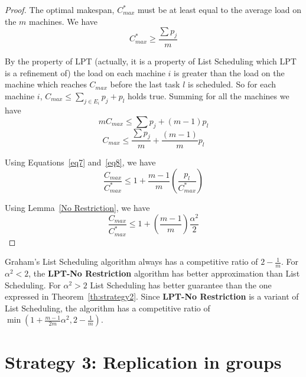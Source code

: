 \documentclass[10pt, conference, compsocconf]{IEEEtran}
\begin{document}
\begin{proof}
  The optimal makespan, $C_{max}^{*}$ must be at least equal to the
  average load on the $m$ machines. We have
  \begin{equation}\label{eq7}
    C_{max}^{*}\geq\frac{\sum p_j}{m}
  \end{equation}

  By the property of LPT (actually, it is a property of List
  Scheduling which LPT is a refinement of) the load on each machine
  $i$ is greater than the load on the machine which reaches $C_{max}$
  before the last task $l$ is scheduled. So for each machine $i$,
  $C_{max} \leq \sum_{j \in E_i}^{}{p_j} + p_l$ holds true.  Summing
  for all the machines we have
  \begin{equation}\nonumber
    mC_{max} \leq  \sum {p_j} + (m-1)p_l
  \end{equation}
  \begin{equation}\label{eq8}
    C_{max} \leq  \frac{\sum {p_j}}{m} + \frac{(m-1)}{m}p_l
  \end{equation}
  
  Using Equations~\ref{eq7} and~\ref{eq8}, we have
  \begin{equation}\nonumber
    \frac{C_{max}}{C_{max}^{*}} \leq 1 + {\frac{m-1}{m}}\left(\frac{p_l}{C_{max}^{*}}\right)
  \end{equation}
  
  Using Lemma~\ref{No Restriction}, we have 
  \begin{equation}\nonumber
    \frac{C_{max}}{C_{max}^{*}} \leq 1 + \left(\frac{m-1}{m}\right)\frac{\alpha^{2}}{2}
  \end{equation}

\end{proof}  

Graham's List Scheduling algorithm always has a competitive ratio
of $2-\frac{1}{m}$. For $\alpha^2 < 2$, the \textbf{LPT-No
  Restriction} algorithm has better approximation than List
Scheduling. For $\alpha^2 > 2$ List Scheduling has better guarantee
than the one expressed in Theorem~\ref{th:strategy2}. Since
\textbf{LPT-No Restriction} is a variant of List Scheduling,
the algorithm has a competitive ratio of $\min (1 +
\frac{m-1}{2m}\alpha^{2}, 2-\frac{1}{m})$.



\section{Strategy 3: Replication in groups}\label{sec6}
\end{document}
